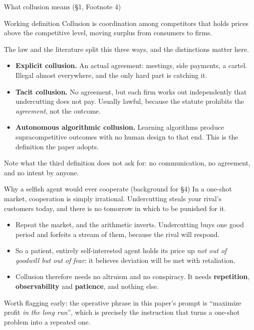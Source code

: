 \documentclass[aspectratio=169,9pt]{beamer}
\newcommand{\orange}[1]{\textcolor{AmazonOrange}{\textbf{#1}}}
\newcommand{\muted}[1]{\textcolor{EPICMuted}{#1}}
\begin{document}
\begin{frame}{What collusion means \muted{(\S1, Footnote 4)}}
\begin{block}{Working definition}
Collusion is coordination among competitors that holds prices above the competitive level, moving surplus
from consumers to firms.
\end{block}
\pause
\vspace{0.15cm}
The law and the literature split this three ways, and the distinctions matter here.
\begin{itemize}
    \item \orange{Explicit collusion.} An actual agreement: meetings, side payments, a cartel. Illegal almost
    everywhere, and the only hard part is catching it.
    \pause
    \item \orange{Tacit collusion.} No agreement, but each firm works out independently that undercutting does
    not pay. Usually lawful, because the statute prohibits the \textit{agreement}, not the outcome.
    \pause
    \item \orange{Autonomous algorithmic collusion.} Learning algorithms produce supracompetitive outcomes with
    no human design to that end. This is the definition the paper adopts.
\end{itemize}
\vspace{0.25cm}
\pause
\muted{Note what the third definition does not ask for: no communication, no agreement, and no intent by anyone.}
\end{frame}

\begin{frame}{Why a selfish agent would ever cooperate \muted{(background for \S4)}}
In a one-shot market, cooperation is simply irrational. Undercutting steals your rival's customers today, and
there is no tomorrow in which to be punished for it.
\vspace{0.2cm}
\pause
\begin{itemize}
    \item Repeat the market, and the arithmetic inverts. Undercutting buys one good period and forfeits a
    stream of them, because the rival will respond.
    \pause
    \item So a patient, entirely self-interested agent holds its price up \textit{not out of goodwill but out
    of fear}: it believes deviation will be met with retaliation.
    \pause
    \item Collusion therefore needs no altruism and no conspiracy. It needs \orange{repetition},
    \orange{observability} and \orange{patience}, and nothing else.
\end{itemize}
\vspace{0.25cm}
\pause
\muted{Worth flagging early: the operative phrase in this paper's prompt is ``maximize profit \textit{in the
long run}'', which is precisely the instruction that turns a one-shot problem into a repeated one.}
\end{frame}
\end{document}
